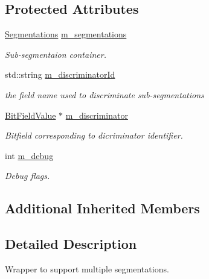 \subsection*{Protected Attributes}
\begin{DoxyCompactItemize}
\item 
\hyperlink{class_d_d4hep_1_1_d_d_segmentation_1_1_multi_segmentation_a083ba7cc081c5c3c47cafac5980100f8}{Segmentations} \hyperlink{class_d_d4hep_1_1_d_d_segmentation_1_1_multi_segmentation_a9af45d1b08e9f34c17ea27dcdf2e1019}{m\+\_\+segmentations}
\begin{DoxyCompactList}\small\item\em Sub-\/segmentaion container. \end{DoxyCompactList}\item 
std\+::string \hyperlink{class_d_d4hep_1_1_d_d_segmentation_1_1_multi_segmentation_a922d7825b1c14d0724bfd1711082b943}{m\+\_\+discriminator\+Id}
\begin{DoxyCompactList}\small\item\em the field name used to discriminate sub-\/segmentations \end{DoxyCompactList}\item 
\hyperlink{class_d_d4hep_1_1_d_d_segmentation_1_1_bit_field_value}{Bit\+Field\+Value} $\ast$ \hyperlink{class_d_d4hep_1_1_d_d_segmentation_1_1_multi_segmentation_a5d86769ef20468667fbc44fc6d8b2a4e}{m\+\_\+discriminator}
\begin{DoxyCompactList}\small\item\em Bitfield corresponding to dicriminator identifier. \end{DoxyCompactList}\item 
int \hyperlink{class_d_d4hep_1_1_d_d_segmentation_1_1_multi_segmentation_aa78b5218bf4246b81cf5e74a1233184c}{m\+\_\+debug}
\begin{DoxyCompactList}\small\item\em Debug flags. \end{DoxyCompactList}\end{DoxyCompactItemize}
\subsection*{Additional Inherited Members}


\subsection{Detailed Description}
Wrapper to support multiple segmentations. 

